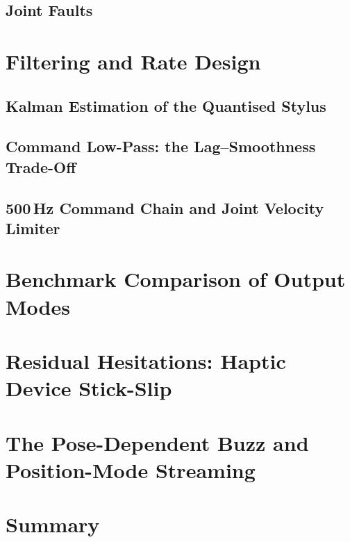 \subsection{Joint Faults}
\label{sec:lat-faults}

\section{Filtering and Rate Design}
\label{sec:lat-filtering}

\subsection{Kalman Estimation of the Quantised Stylus}
\label{sec:lat-kalman}

\subsection{Command Low-Pass: the Lag--Smoothness Trade-Off}
\label{sec:lat-lowpass}

\subsection{500\,Hz Command Chain and Joint Velocity Limiter}
\label{sec:lat-limiter}

\section{Benchmark Comparison of Output Modes}
\label{sec:lat-benchmarks}

\section{Residual Hesitations: Haptic Device Stick-Slip}
\label{sec:lat-stickslip}

\section{The Pose-Dependent Buzz and Position-Mode Streaming}
\label{sec:lat-buzz}

\section{Summary}
\label{sec:lat-summary}
